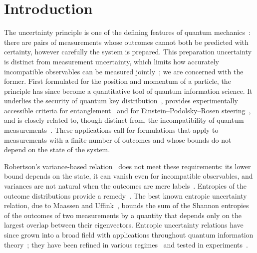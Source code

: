 \documentclass[aps,pra,twocolumn,superscriptaddress,nofootinbib,floatfix]{revtex4-2}
\theoremstyle{definition}
\begin{document}
\maketitle

\section{Introduction}
\label{sec:intro}

The uncertainty principle is one of the defining features of quantum
mechanics~\cite{Heisenberg1927,Robertson1929,BuschHeinonenLahti2007}: there are
pairs of measurements whose outcomes cannot both be predicted with certainty,
however carefully the system is prepared.
This preparation uncertainty is distinct from measurement uncertainty, which
limits how accurately incompatible observables can be measured
jointly~\cite{BuschLahtiWerner2014}; we are concerned with the former.
First formulated for the position and momentum of a particle, the principle
has since become a quantitative tool of quantum information science.
It underlies the security of quantum key
distribution~\cite{BB84,Berta2010,TomamichelRenner2011}, provides
experimentally accessible criteria for
entanglement~\cite{HofmannTakeuchi2003,Guhne2004,Berta2010} and for
Einstein--Podolsky--Rosen steering~\cite{Walborn2011,Schneeloch2013,Uola2020},
and is closely
related to, though distinct from, the incompatibility of quantum
measurements~\cite{HMZ2016,Guhne2023}.
These applications call for formulations that apply to measurements with a
finite number of outcomes and whose bounds do not depend on the state of the
system.

Robertson's variance-based relation~\cite{Robertson1929} does not meet these
requirements: its lower bound depends on the state, it can vanish even for
incompatible observables, and variances are not natural when the outcomes are
mere labels~\cite{Deutsch1983}.
Entropies of the outcome distributions provide a
remedy~\cite{Hirschman1957,Beckner1975,BBM1975,Deutsch1983,Kraus1987}.
The best known entropic uncertainty relation, due to Maassen and
Uffink~\cite{MaassenUffink1988}, bounds the sum of the Shannon entropies of the
outcomes of two measurements by a quantity that depends only on the largest
overlap between their eigenvectors.
Entropic uncertainty relations have since grown into a broad field with
applications throughout quantum information
theory~\cite{WehnerWinter2010,Coles2017}; they have been refined in various
regimes~\cite{deVicente2008,ColesPiani2014} and tested in
experiments~\cite{Prevedel2011,LiXu2011}.
\end{document}
